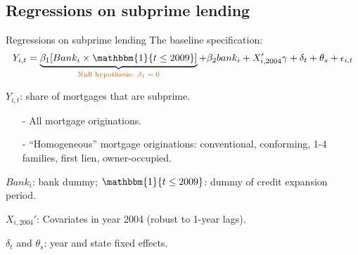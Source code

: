 \documentclass[notes,11pt, aspectratio=169]{beamer}
\newenvironment{wideitemize}{\itemize\addtolength{\itemsep}{10pt}}{\enditemize}  %
\begin{document}
\subsection*{Regressions on subprime lending}

\begin{frame}{Regressions on subprime lending}
The baseline specification: 
\begin{equation*}
    Y_{i,t} = \underbrace{\beta_1 [ Bank_i \times \mathbbm{1}\{ t \leq 2009 \} ]}_{\text{\textcolor{red}{Null hypothesis: $\beta_1=0$}}} + \beta_2 bank_i + X_{i, 2004}' \gamma + \delta_t + \theta_s + \epsilon_{i,t}
\end{equation*}

\begin{wideitemize}
    \item <1-> $Y_{i,t}$: share of mortgages that are subprime. 
    \begin{itemize}
        \item [-] All mortgage originations.
        \item [-] ``Homogeneous'' mortgage originations: conventional, conforming, 1-4 families, first lien, owner-occupied.
    \end{itemize}
    
    \item <2-> $Bank_i$: bank dummy; $\mathbbm{1}\{ t \leq 2009 \}$: dummy of credit expansion period. 
    
    \item <3> $X_{i, 2004}'$: Covariates in year 2004 (robust to 1-year lags).
    
    \item <3> $\delta_t$ and $\theta_s$: year and state fixed effects.
\end{wideitemize}
\end{frame}
\end{document}
